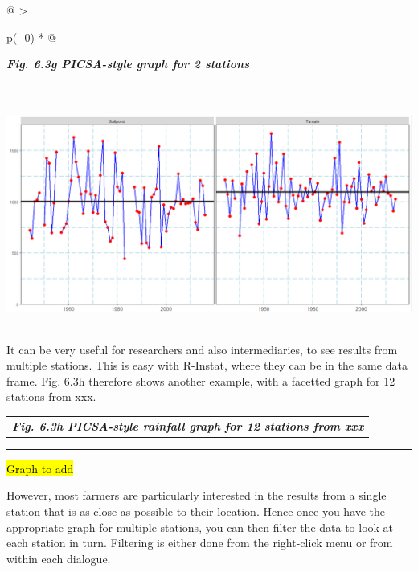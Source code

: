 \documentclass[
  letterpaper,
  DIV=11,
  numbers=noendperiod]{scrreprt}
\begin{document}
\begin{longtable}[]{@{}
  >{\raggedright\arraybackslash}p{(\columnwidth - 0\tabcolsep) * }@{}}
\toprule\noalign{}
\begin{minipage}[b]{\linewidth}\raggedright
\textbf{\emph{Fig. 6.3g PICSA-style graph for 2 stations}}
\end{minipage} \\
\midrule\noalign{}
\endhead
\bottomrule\noalign{}
\endlastfoot
\includegraphics[width=6.06534in,height=2.95472in]{figures/fig6.3g.png} \\
\end{longtable}

It can be very useful for researchers and also intermediaries, to see
results from multiple stations. This is easy with R-Instat, where they
can be in the same data frame. Fig. 6.3h therefore shows another
example, with a facetted graph for 12 stations from xxx.

\begin{longtable}[]{@{}l@{}}
\toprule\noalign{}
\endhead
\bottomrule\noalign{}
\endlastfoot
\textbf{\emph{Fig. 6.3h PICSA-style rainfall graph for 12 stations from
xxx}} \\
\end{longtable}

\begin{center}\rule{0.5\linewidth}{0.5pt}\end{center}

\hl{Graph to add}

However, most farmers are particularly interested in the results from a
single station that is as close as possible to their location. Hence
once you have the appropriate graph for multiple stations, you can then
filter the data to look at each station in turn. Filtering is either
done from the right-click menu or from within each dialogue.
\end{document}
